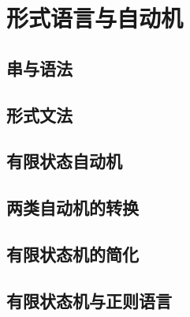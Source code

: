 \section{形式语言与自动机}

\subsection{串与语法}

\subsection{形式文法}

\subsection{有限状态自动机}

\subsection{两类自动机的转换}

\subsection{有限状态机的简化}

\subsection{有限状态机与正则语言}